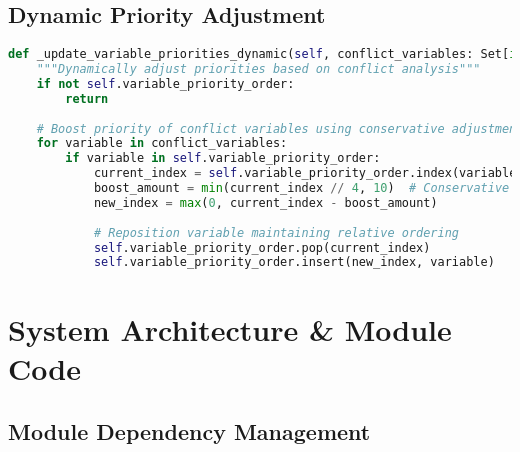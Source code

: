 \subsection{Dynamic Priority Adjustment}
\label{appendix:priority-adjustment}

\begin{lstlisting}[language=Python, caption=Dynamic Priority Adjustment]
def _update_variable_priorities_dynamic(self, conflict_variables: Set[int]) -> None:
    """Dynamically adjust priorities based on conflict analysis"""
    if not self.variable_priority_order:
        return
    
    # Boost priority of conflict variables using conservative adjustment
    for variable in conflict_variables:
        if variable in self.variable_priority_order:
            current_index = self.variable_priority_order.index(variable)
            boost_amount = min(current_index // 4, 10)  # Conservative boosting
            new_index = max(0, current_index - boost_amount)
            
            # Reposition variable maintaining relative ordering
            self.variable_priority_order.pop(current_index)
            self.variable_priority_order.insert(new_index, variable)
\end{lstlisting}

\section{System Architecture \& Module Code}

\subsection{Module Dependency Management}
\label{appendix:module-dependency}

